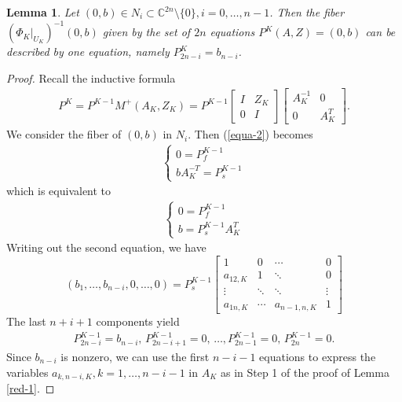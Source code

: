 \documentclass[10pt]{amsart}
\newtheorem{lemm}[theo]{Lemma}
\theoremstyle{remark}
\begin{document}
\begin{lemm}\label{red-2}
     Let $(0,b)\in N_i \subset \mathbb{C}^{2n}\setminus \{0\}, i = 0, \dots, n-1$. Then the fiber $(\Phi_K|_{U_K})^{-1}(0,b)$ given by the set of $2n$ equations $P^K(A,Z)=(0,b)$ can be described by one equation, namely $P^K_{2n-i}=b_{n-i}$.
\end{lemm}
\begin{proof}%
Recall the inductive formula
\begin{align*}
    P^K = P^{K-1} M^+(A_K,Z_K) = P^{K-1} \left[\begin{array}{ccc} I & Z_K \\ 0 & I\end{array}\right] \left[\begin{array}{ccc} A^{-1}_K & 0 \\ 0 & A^T_K\end{array}\right].
\end{align*}
We consider the fiber of $(0,b)$ in $N_i$. Then (\ref{equa-2}) becomes
\begin{align*}
    \begin{cases}
    0 = P^{K-1}_{f} \\
    b A^{-T}_K = P^{K-1}_s  
    \end{cases}
\end{align*}
which is equivalent to
\begin{align} \label{P_f=0}
    \begin{cases}
    0 = P^{K-1}_{f}  \\
    b  = P^{K-1}_s  A^{T}_K
    \end{cases}
\end{align}
Writing out the second equation, we have
\[
    ( b_1, \dots, b_{n-i}, 0, \dots, 0) = P^{K-1}_s 
    \begin{bmatrix}
     1 & 0 & \cdots &0 \\  a_{12,K} & 1 & \ddots & 0 \\
    \vdots & \ddots & \ddots & \vdots \\
    a_{1n,K} & \cdots & a_{n-1,n,K} & 1
    \end{bmatrix}
\]
The last $n+i+1$ components yield
\begin{align} \label{n+i+1}
    P^{K-1}_{2n-i}=b_{n-i}, \, P^{K-1}_{2n-i+1}=0, \, \dots, P^{K-1}_{2n-1} = 0, \, P^{K-1}_{2n} = 0.
\end{align}
Since $b_{n-i}$ is nonzero, we can use the first $n-i-1$ equations to express the variables $a_{k,n-i,K}, k = 1, \dots, n-i-1$ in $A_K$ as in Step 1 of the proof of Lemma \ref{red-1}.


\end{proof}
\end{document}

